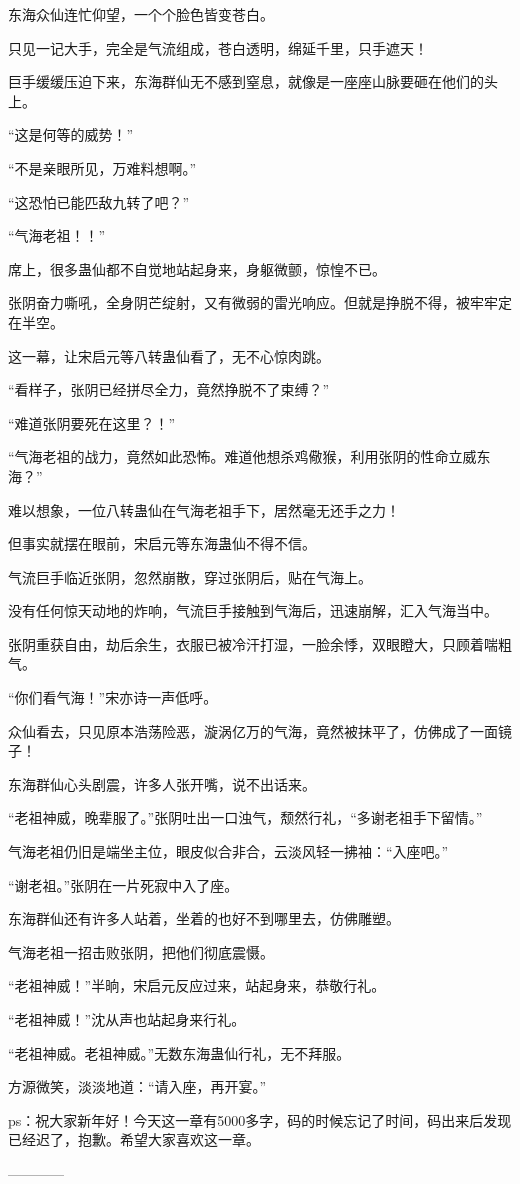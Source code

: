 \begin{this_body}
东海众仙连忙仰望，一个个脸色皆变苍白。

只见一记大手，完全是气流组成，苍白透明，绵延千里，只手遮天！

巨手缓缓压迫下来，东海群仙无不感到窒息，就像是一座座山脉要砸在他们的头上。

“这是何等的威势！”

“不是亲眼所见，万难料想啊。”

“这恐怕已能匹敌九转了吧？”

“气海老祖！！”

席上，很多蛊仙都不自觉地站起身来，身躯微颤，惊惶不已。

张阴奋力嘶吼，全身阴芒绽射，又有微弱的雷光响应。但就是挣脱不得，被牢牢定在半空。

这一幕，让宋启元等八转蛊仙看了，无不心惊肉跳。

“看样子，张阴已经拼尽全力，竟然挣脱不了束缚？”

“难道张阴要死在这里？！”

“气海老祖的战力，竟然如此恐怖。难道他想杀鸡儆猴，利用张阴的性命立威东海？”

难以想象，一位八转蛊仙在气海老祖手下，居然毫无还手之力！

但事实就摆在眼前，宋启元等东海蛊仙不得不信。

气流巨手临近张阴，忽然崩散，穿过张阴后，贴在气海上。

没有任何惊天动地的炸响，气流巨手接触到气海后，迅速崩解，汇入气海当中。

张阴重获自由，劫后余生，衣服已被冷汗打湿，一脸余悸，双眼瞪大，只顾着喘粗气。

“你们看气海！”宋亦诗一声低呼。

众仙看去，只见原本浩荡险恶，漩涡亿万的气海，竟然被抹平了，仿佛成了一面镜子！

东海群仙心头剧震，许多人张开嘴，说不出话来。

“老祖神威，晚辈服了。”张阴吐出一口浊气，颓然行礼，“多谢老祖手下留情。”

气海老祖仍旧是端坐主位，眼皮似合非合，云淡风轻一拂袖：“入座吧。”

“谢老祖。”张阴在一片死寂中入了座。

东海群仙还有许多人站着，坐着的也好不到哪里去，仿佛雕塑。

气海老祖一招击败张阴，把他们彻底震慑。

“老祖神威！”半晌，宋启元反应过来，站起身来，恭敬行礼。

“老祖神威！”沈从声也站起身来行礼。

“老祖神威。老祖神威。”无数东海蛊仙行礼，无不拜服。

方源微笑，淡淡地道：“请入座，再开宴。”

ps：祝大家新年好！今天这一章有5000多字，码的时候忘记了时间，码出来后发现已经迟了，抱歉。希望大家喜欢这一章。

------------

\end{this_body}

